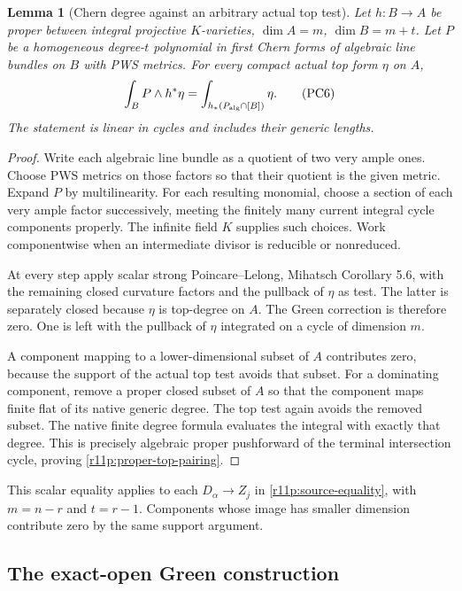 \documentclass[11pt]{article}
\newtheorem{lemma}[theorem]{Lemma}
\theoremstyle{definition}
\theoremstyle{remark}
\numberwithin{equation}{section}
\begin{document}
\begin{lemma}[Chern degree against an arbitrary actual top test]
\label{r11p:proper-chern-degree}
Let $h:B\to A$ be proper between integral projective $K$-varieties,
$\dim A=m$, $\dim B=m+t$.  Let $P$ be a homogeneous degree-$t$
polynomial in first Chern forms of algebraic line bundles on $B$
with PWS metrics.  For every compact actual top form $\eta$ on $A$,
\[
              \int_BP\wedge h^*\eta
                =\int_{h_*(P_{\rm alg}\cap[B])}\eta.
\tag{PC6}\label{r11p:proper-top-pairing}
\]
The statement is linear in cycles and includes their generic lengths.
\end{lemma}

\begin{proof}
Write each algebraic line bundle as a quotient of two very ample ones.
Choose PWS metrics on those factors so that their quotient is the
given metric.  Expand $P$ by multilinearity.  For each resulting
monomial, choose a section of each very ample factor successively,
meeting the finitely many current integral cycle components properly.
The infinite field $K$ supplies such choices.  Work componentwise
when an intermediate divisor is reducible or nonreduced.

At every step apply scalar strong Poincare--Lelong, Mihatsch
Corollary 5.6, with the remaining closed curvature factors and the
pullback of $\eta$ as test.  The latter is separately closed because
$\eta$ is top-degree on $A$.  The Green correction is therefore zero.
One is left with the pullback of $\eta$ integrated on a cycle of
dimension $m$.

A component mapping to a lower-dimensional subset of $A$ contributes
zero, because the support of the actual top test avoids that subset.
For a dominating component, remove a proper closed subset of $A$
so that the component maps finite flat of its native generic degree.
The top test again avoids the removed subset.  The native finite
degree formula evaluates the integral with exactly that degree.
This is precisely algebraic proper pushforward of the terminal
intersection cycle, proving \eqref{r11p:proper-top-pairing}.
\end{proof}

This scalar equality applies to
each $D_\alpha\to Z_j$ in \eqref{r11p:source-equality}, with
$m=n-r$ and $t=r-1$.  Components whose image has smaller dimension
contribute zero by the same support argument.

\subsection{The exact-open Green construction}
\end{document}
